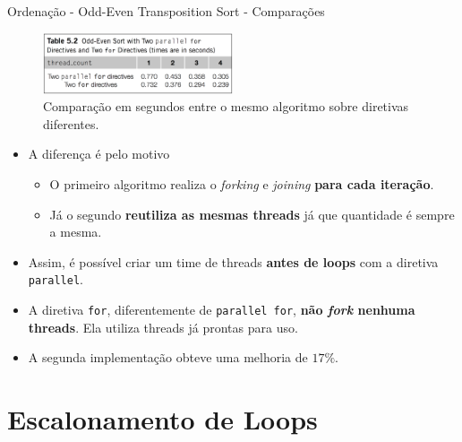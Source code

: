 	\begin{frame}{Ordenação - Odd-Even Transposition Sort - Comparações}
		\begin{figure}[p]
			\centering
			\includegraphics[width=0.5\textwidth]{img/pacheco/odd-even_comparation.png}
			\caption{Comparação em segundos entre o mesmo algoritmo sobre diretivas diferentes.}
		\end{figure}
		\begin{itemize}
			\setlength\itemsep{0.2em}
			\item A diferença é pelo motivo
			\begin{itemize}
				\item O primeiro algoritmo realiza o \textit{forking} e \textit{joining} \textbf{para cada iteração}.
				\item Já o segundo \textbf{reutiliza as mesmas threads} já que quantidade é sempre a mesma.
			\end{itemize}
					\bigskip
			\item Assim, é possível criar um time de threads \textbf{antes de loops} com a diretiva {\tt parallel}.
			\item A diretiva {\tt for}, diferentemente de {\tt parallel for}, \textbf{não \textit{fork} nenhuma threads}. Ela utiliza threads já prontas para uso.
			\item A segunda implementação obteve uma melhoria de \textbf{$17\%$}.
		\end{itemize}
	\end{frame}








\section{Escalonamento de Loops}
